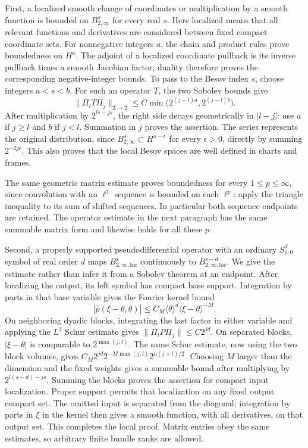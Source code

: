 \documentclass[
  11pt,
]{article}
\begin{document}
First, a localized smooth change of coordinates or multiplication by a
smooth function is bounded on \(B^s_{2,\infty}\) for every real \(s\).
Here localized means that all relevant functions and derivatives are
considered between fixed compact coordinate sets. For nonnegative
integers \(a\), the chain and product rules prove boundedness on
\(H^a\). The adjoint of a localized coordinate pullback is its inverse
pullback times a smooth Jacobian factor; duality therefore proves the
corresponding negative-integer bounds. To pass to the Besov index \(s\),
choose integers \(a<s<b\). For such an operator \(T\), the two Sobolev
bounds give \[
\|\Pi_lT\Pi_j\|_{2\to2}
\leq C\min\big(2^{(j-l)a},2^{(j-l)b}\big).
\] After multiplication by \(2^{ls-js}\), the right side decays
geometrically in \(|l-j|\): use \(a\) if \(j\geq l\) and \(b\) if
\(j<l\). Summation in \(j\) proves the assertion. The series represents
the original distribution, since
\(B^s_{2,\infty}\subset H^{s-\epsilon}\) for every \(\epsilon>0\),
directly by summing \(2^{-2j\epsilon}\). This also proves that the local
Besov spaces are well defined in charts and frames.

The same geometric matrix estimate proves boundedness for every
\(1\leq p\leq\infty\), since convolution with an \(\ell^1\) sequence is
bounded on each \(\ell^p\): apply the triangle inequality to its sum of
shifted sequences. In particular both sequence endpoints are retained.
The operator estimate in the next paragraph has the same summable matrix
form and likewise holds for all these \(p\).

Second, a properly supported pseudodifferential operator with an
ordinary \(S^d_{1,0}\) symbol of real order \(d\) maps
\(B^s_{2,\infty,\mathrm{loc}}\) continuously to
\(B^{s-d}_{2,\infty,\mathrm{loc}}\). We give the estimate rather than
infer it from a Sobolev theorem at an endpoint. After localizing the
output, its left symbol has compact base support. Integration by parts
in that base variable gives the Fourier kernel bound \[
|\widehat p(\xi-\theta,\theta)|
\leq C_M\langle\theta\rangle^d\langle\xi-\theta\rangle^{-M}.
\tag{C3}
\] On neighboring dyadic blocks, integrating the last factor in either
variable and applying the \(L^2\) Schur estimate gives
\(\|\Pi_lP\Pi_j\|\leq C2^{jd}\). On separated blocks, \(|\xi-\theta|\)
is comparable to \(2^{\max(j,l)}\). The same Schur estimate, now using
the two block volumes, gives \(C_M2^{jd}2^{-M\max(j,l)}2^{n(j+l)/2}\).
Choosing \(M\) larger than the dimension and the fixed weights gives a
summable bound after multiplying by \(2^{l(s-d)-js}\). Summing the
blocks proves the assertion for compact input localization. Proper
support permits that localization on any fixed output compact set. The
omitted input is separated from the diagonal; integration by parts in
\(\xi\) in the kernel then gives a smooth function, with all
derivatives, on that output set. This completes the local proof. Matrix
entries obey the same estimates, so arbitrary finite bundle ranks are
allowed.
\end{document}
